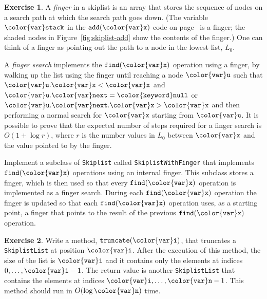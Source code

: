 \documentclass[10pt]{book}
\newcommand{\figref}[1]{Figure~\ref{fig:#1}}
\theoremstyle{plain}
\theoremstyle{definition}
\newtheorem{exc}{Exercise}[chapter]
\newcommand{\exclabel}[1]{\label{exc:#1}}
\begin{document}
\begin{exc}
  A \emph{finger} in a skiplist is an array that stores the
  sequence of nodes on a search path at which the search path
  goes down. (The variable \ensuremath{\mathtt{{\color{var}stack}}} in the \ensuremath{\mathtt{add({\color{var}x})}} code on
  page~\pageref{pg:skiplist-add} is a finger;  the shaded nodes in
  \figref{skiplist-add} show the contents of the finger.)  One can
  think of a finger as pointing out the path to a node in the lowest
  list, $L_0$.

  A \emph{finger search} implements the \ensuremath{\mathtt{find({\color{var}x})}} operation using a
  finger, by walking up the list using the finger until reaching a node
  \ensuremath{\mathtt{{\color{var}u}}} such that $\ensuremath{\mathtt{{\color{var}u}.{\color{var}x}}} < \ensuremath{\mathtt{{\color{var}x}}}$ and $\ensuremath{\mathtt{{\color{var}u}.{\color{var}next}}}=\ensuremath{\mathtt{{\color{keyword}null}}}$ or $\ensuremath{\mathtt{{\color{var}u}.{\color{var}next}.{\color{var}x}}} >
  \ensuremath{\mathtt{{\color{var}x}}}$ and then performing a normal search for \ensuremath{\mathtt{{\color{var}x}}} starting from \ensuremath{\mathtt{{\color{var}u}}}.
  It is possible to prove that the expected number of steps required
  for a finger search is $O(1+\log r)$, where $r$ is the number values
  in $L_0$ between \ensuremath{\mathtt{{\color{var}x}}} and the value pointed to by the finger.

  Implement a subclass of \texttt{Skiplist} called \texttt{SkiplistWithFinger} that
  implements \ensuremath{\mathtt{find({\color{var}x})}} operations using an internal finger.  This subclass
  stores a finger, which is then used so that every \ensuremath{\mathtt{find({\color{var}x})}} operation
  is implemented as a finger search.  During each \ensuremath{\mathtt{find({\color{var}x})}} operation
  the finger is updated so that each \ensuremath{\mathtt{find({\color{var}x})}} operation uses, as a
  starting point, a finger that points to the result of the previous
  \ensuremath{\mathtt{find({\color{var}x})}} operation.
\end{exc}

\begin{exc}\exclabel{skiplist-truncate}
  Write a method, \ensuremath{\mathtt{truncate({\color{var}i})}}, that truncates a \texttt{SkiplistList}
  at position \ensuremath{\mathtt{{\color{var}i}}}.  After the execution of this method, the size
  of the list is \ensuremath{\mathtt{{\color{var}i}}} and it contains only the elements at indices
  $0,\ldots,\ensuremath{\mathtt{{\color{var}i}}}-1$.  The return value is another \texttt{SkiplistList} that
  contains the elements at indices $\ensuremath{\mathtt{{\color{var}i}}},\ldots,\ensuremath{\mathtt{{\color{var}n}}}-1$.  This method
  should run in $O(\log \ensuremath{\mathtt{{\color{var}n}}})$ time.
\end{exc}
\end{document}
